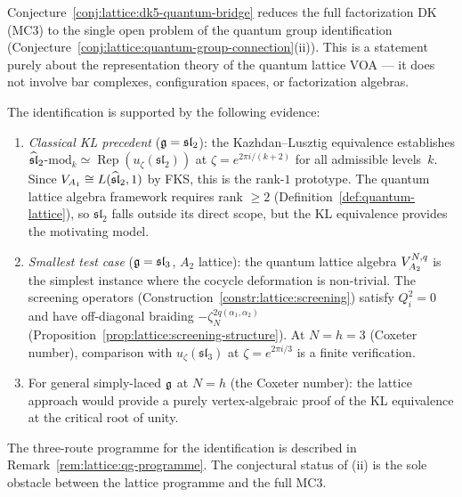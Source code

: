 \begin{remark}
\label{rem:lattice:qg-status}
Conjecture~\ref{conj:lattice:dk5-quantum-bridge} reduces the full
factorization DK (MC3) to the single open problem of the quantum
group identification
(Conjecture~\ref{conj:lattice:quantum-group-connection}(ii)).
This is a statement purely about the representation theory of the
quantum lattice VOA --- it does not involve bar complexes,
configuration spaces, or factorization algebras.

The identification is supported by the following evidence:
\begin{enumerate}[label=\textup{(\alph*)}]
\item \emph{Classical KL precedent}
  ($\mathfrak{g} = \mathfrak{sl}_2$):
  the Kazhdan--Lusztig equivalence \cite{KL93}
  establishes $\widehat{\mathfrak{sl}}_2$-$\mathrm{mod}_k \simeq
  \operatorname{Rep}(u_\zeta(\mathfrak{sl}_2))$ at
  $\zeta = e^{2\pi i/(k+2)}$ for all admissible levels~$k$.
  Since $V_{A_1} \cong L(\widehat{\mathfrak{sl}}_2, 1)$ by FKS, this
  is the rank-$1$ prototype.  The quantum lattice algebra
  framework requires rank $\geq 2$
  (Definition~\ref{def:quantum-lattice}), so $\mathfrak{sl}_2$
  falls outside its direct scope, but the KL equivalence provides
  the motivating model.

\item \emph{Smallest test case}
  ($\mathfrak{g} = \mathfrak{sl}_3$, $A_2$ lattice):
  the quantum lattice algebra $V_{A_2}^{N,q}$ is the
  simplest instance where the cocycle deformation is non-trivial.
  The screening operators
  (Construction~\ref{constr:lattice:screening}) satisfy $Q_i^2 = 0$
  and have off-diagonal braiding
  $-\zeta_N^{2q(\alpha_1,\alpha_2)}$
  (Proposition~\ref{prop:lattice:screening-structure}).
  At $N = h = 3$ (Coxeter number), comparison with
  $u_\zeta(\mathfrak{sl}_3)$ at $\zeta = e^{2\pi i/3}$ is a
  finite verification.
\item For general simply-laced $\mathfrak{g}$ at $N = h$ (the Coxeter
  number): the lattice approach would provide a purely
  vertex-algebraic proof of the KL equivalence at the critical
  root of unity.
\end{enumerate}
The three-route programme for the identification is described in
Remark~\ref{rem:lattice:qg-programme}.  The conjectural status of
(ii) is the sole obstacle between the lattice programme and the
full MC3.
\end{remark}

